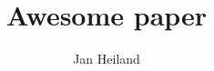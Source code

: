 \documentclass[a4paper,10pt]{article}
\title{Awesome paper}
\author{Jan Heiland}
\begin{document}
\maketitle
\tableofcontents

\section{}



\end{document}
